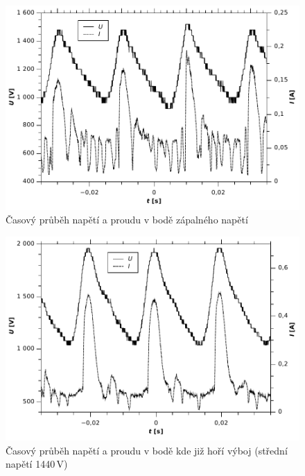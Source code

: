 \documentclass[12pt]{article}
\begin{document}
\begin{figure}[htbp]
\begin{center}
\includegraphics[width=12cm]{zapalnenapeti.pdf}
\caption{Časový průběh napětí a proudu v bodě zápalného napětí}
\label{vyvoj1}
\end{center}
\end{figure}

\begin{figure}[htbp]
\begin{center}
\includegraphics[width=12cm]{horicivyboj.pdf}
\caption{Časový průběh napětí a proudu v bodě kde již hoří výboj (střední napětí 1440\,V)}
\label{vyvoj2}
\end{center}
\end{figure}
\end{document}
